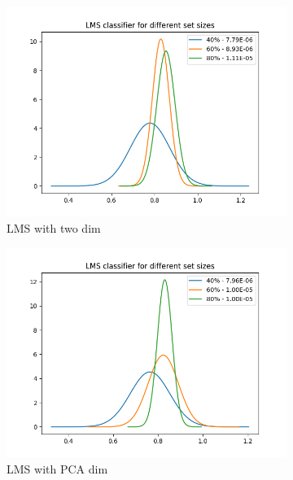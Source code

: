 \documentclass[12pt, a4paper]{article}
\begin{document}
\begin{figure}[H]
\begin{subfigure}{0.3\textwidth}
        \includegraphics[width=\textwidth]{recursos/1/lms_2}
        \caption{LMS with two dim}
    \end{subfigure}
    \begin{subfigure}{0.3\textwidth}
        \includegraphics[width=\textwidth]{recursos/1/lms_pca}
         \caption{LMS with PCA dim}
    \end{subfigure}
    \begin{subfigure}{0.3\textwidth}

\end{subfigure}
\end{figure}
\end{document}

